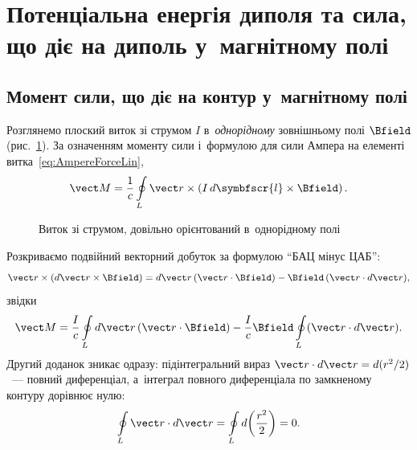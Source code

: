 \section{Потенціальна енергія диполя та сила, що діє на диполь у~магнітному полі}\hypertarget{magnetic-dipole-energy-force}{}


\subsection*{Момент сили, що діє на контур у~магнітному полі}


Розглянемо плоский виток зі струмом $I$ в~\emph{однорідному} зовнішньому полі $\Bfield$
(рис.~\ref{pic:TorqueLoop}). За означенням моменту сили і~формулою для сили Ампера на
елементі витка~\eqref{eq:AmpereForceLin},
\begin{equation*}
	\vect M = \frac1c \oint\limits_L \vect r\times\left(I\, d\symbfscr{l}\times\Bfield\right).
\end{equation*}

\begin{figure}\centering
	\caption{Виток зі струмом, довільно орієнтований в~однорідному
		полі\label{pic:TorqueLoop}}
\end{figure}

Розкриваємо подвійний векторний добуток за формулою \enquote{БАЦ мінус ЦАБ}:
\begin{equation*}
	\vect r\times(d\vect r\times\Bfield) = d\vect r\,(\vect r\cdot\Bfield) - \Bfield\,(\vect r\cdot d\vect r),
\end{equation*}
звідки
\begin{equation}\label{eq:TorqueTwoTerms}
	\vect M = \frac{I}{c}\oint\limits_L d\vect r\,(\vect r\cdot\Bfield) - \frac{I}{c}\Bfield\oint\limits_L(\vect r\cdot d\vect r).
\end{equation}
Другий доданок зникає одразу: підінтегральний вираз $\vect r\cdot d\vect r = d(r^2/2)$~---
повний диференціал, а~інтеграл повного диференціала по замкненому контуру дорівнює нулю:
\begin{equation}\label{eq:TotalDiffZero1}
	\oint\limits_L \vect r\cdot d\vect r = \oint\limits_L d\!\left(\frac{r^2}{2}\right) = 0.
\end{equation}

